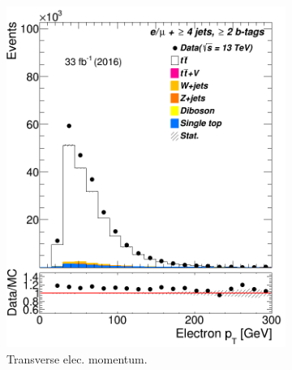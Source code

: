 	\begin{figure} %
		\centering
	
	\medskip
	\begin{subfigure}{0.25\textwidth}
		\includegraphics[width=\linewidth]{ControlPlots_emujets_2016_4incl_2incl/el_pt_emujets_2016.png}
		\caption{Transverse elec. momentum.} \label{fig:e1}
	\end{subfigure}\hspace*{1.0cm}
	\begin{subfigure}{0.25\textwidth}

\end{subfigure}
\end{figure}
